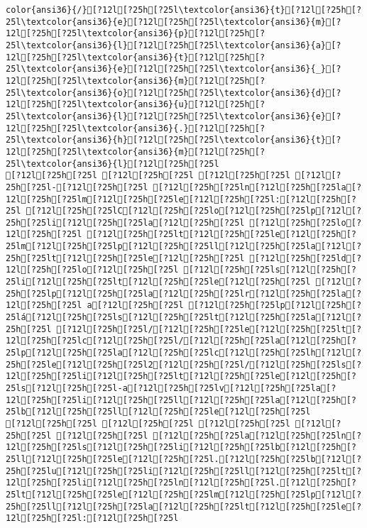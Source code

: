 \documentclass{scrartcl}
\begin{document}
\begin{Verbatim}
color{ansi36}{/}[?12l[?25h[?25l\textcolor{ansi36}{t}[?12l[?25h[?25l\textcolor{ansi36}{e}[?12l[?25h[?25l\textcolor{ansi36}{m}[?12l[?25h[?25l\textcolor{ansi36}{p}[?12l[?25h[?25l\textcolor{ansi36}{l}[?12l[?25h[?25l\textcolor{ansi36}{a}[?12l[?25h[?25l\textcolor{ansi36}{t}[?12l[?25h[?25l\textcolor{ansi36}{e}[?12l[?25h[?25l\textcolor{ansi36}{_}[?12l[?25h[?25l\textcolor{ansi36}{m}[?12l[?25h[?25l\textcolor{ansi36}{o}[?12l[?25h[?25l\textcolor{ansi36}{d}[?12l[?25h[?25l\textcolor{ansi36}{u}[?12l[?25h[?25l\textcolor{ansi36}{l}[?12l[?25h[?25l\textcolor{ansi36}{e}[?12l[?25h[?25l\textcolor{ansi36}{.}[?12l[?25h[?25l\textcolor{ansi36}{h}[?12l[?25h[?25l\textcolor{ansi36}{t}[?12l[?25h[?25l\textcolor{ansi36}{m}[?12l[?25h[?25l\textcolor{ansi36}{l}[?12l[?25h[?25l
[?12l[?25h[?25l [?12l[?25h[?25l [?12l[?25h[?25l [?12l[?25h[?25l-[?12l[?25h[?25l [?12l[?25h[?25ln[?12l[?25h[?25la[?12l[?25h[?25lm[?12l[?25h[?25le[?12l[?25h[?25l:[?12l[?25h[?25l [?12l[?25h[?25lC[?12l[?25h[?25lo[?12l[?25h[?25lp[?12l[?25h[?25li[?12l[?25h[?25la[?12l[?25h[?25l [?12l[?25h[?25lo[?12l[?25h[?25l [?12l[?25h[?25lt[?12l[?25h[?25le[?12l[?25h[?25lm[?12l[?25h[?25lp[?12l[?25h[?25ll[?12l[?25h[?25la[?12l[?25h[?25lt[?12l[?25h[?25le[?12l[?25h[?25l [?12l[?25h[?25ld[?12l[?25h[?25lo[?12l[?25h[?25l [?12l[?25h[?25ls[?12l[?25h[?25li[?12l[?25h[?25lt[?12l[?25h[?25le[?12l[?25h[?25l [?12l[?25h[?25lp[?12l[?25h[?25la[?12l[?25h[?25lr[?12l[?25h[?25la[?12l[?25h[?25l a[?12l[?25h[?25l [?12l[?25h[?25lp[?12l[?25h[?25lá[?12l[?25h[?25ls[?12l[?25h[?25lt[?12l[?25h[?25la[?12l[?25h[?25l [?12l[?25h[?25l/[?12l[?25h[?25le[?12l[?25h[?25lt[?12l[?25h[?25lc[?12l[?25h[?25l/[?12l[?25h[?25la[?12l[?25h[?25lp[?12l[?25h[?25la[?12l[?25h[?25lc[?12l[?25h[?25lh[?12l[?25h[?25le[?12l[?25h[?25l2[?12l[?25h[?25l/[?12l[?25h[?25ls[?12l[?25h[?25li[?12l[?25h[?25lt[?12l[?25h[?25le[?12l[?25h[?25ls[?12l[?25h[?25l-a[?12l[?25h[?25lv[?12l[?25h[?25la[?12l[?25h[?25li[?12l[?25h[?25ll[?12l[?25h[?25la[?12l[?25h[?25lb[?12l[?25h[?25ll[?12l[?25h[?25le[?12l[?25h[?25l
[?12l[?25h[?25l [?12l[?25h[?25l [?12l[?25h[?25l [?12l[?25h[?25l [?12l[?25h[?25l [?12l[?25h[?25la[?12l[?25h[?25ln[?12l[?25h[?25ls[?12l[?25h[?25li[?12l[?25h[?25lb[?12l[?25h[?25ll[?12l[?25h[?25le[?12l[?25h[?25l.[?12l[?25h[?25lb[?12l[?25h[?25lu[?12l[?25h[?25li[?12l[?25h[?25ll[?12l[?25h[?25lt[?12l[?25h[?25li[?12l[?25h[?25ln[?12l[?25h[?25l.[?12l[?25h[?25lt[?12l[?25h[?25le[?12l[?25h[?25lm[?12l[?25h[?25lp[?12l[?25h[?25ll[?12l[?25h[?25la[?12l[?25h[?25lt[?12l[?25h[?25le[?12l[?25h[?25l:[?12l[?25h[?25l

\end{Verbatim}
\end{document}
